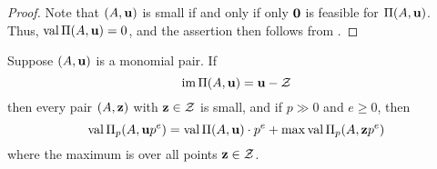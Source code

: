 \documentclass[11pt]{amsart}
\begin{document}
\begin{proof}
Note that $(A, \mathbf{u})$ is small if and only if only $\mathbf{0}$ is feasible for $\Pi(A, \mathbf{u})$.   Thus, $\operatorname{val} \Pi(A, \mathbf{u}) = 0$, and the assertion then follows from .
\end{proof}




\begin{proposition}
\label{follow-leftovers: P}
Suppose $(A, \mathbf{u})$ is a monomial pair.  If \[ \operatorname{im} \Pi(A, \mathbf{u}) = \mathbf{u} - \mathcal{Z}\] then every pair $(A, \mathbf{z})$ with $\mathbf{z} \in \mathcal{Z}$ is small, and if $p \gg 0$ and $e \geq 0$, then 
\[ \operatorname{val} \Pi_p(A, \mathbf{u} p^e) = \operatorname{val} \Pi(A, \mathbf{u}) \cdot p^e + \max \operatorname{val} \Pi_p(A, \mathbf{z}p^e) \]
where the maximum is over all points $\mathbf{z} \in \mathcal{Z}$.
\end{proposition}

\end{document}
